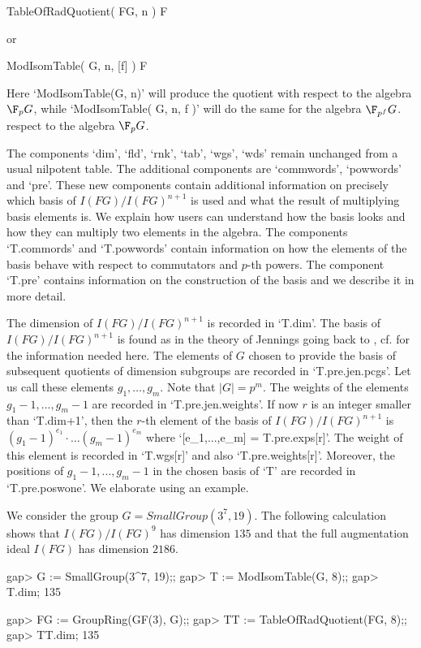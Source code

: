 \> TableOfRadQuotient( FG, n ) F

or 

\> ModIsomTable( G, n, [f] ) F

Here `ModIsomTable(G, n)' will produce the quotient with respect to the algebra
$\F_pG$, while `ModIsomTable( G, n, f )' will do the same for the algebra $\F_{p^f}G$.
respect to the algebra $\F_pG$.
\medskip 

The components `dim', `fld', `rnk', `tab', `wgs', `wds'
 remain unchanged from a usual nilpotent table. The additional components are
`commwords', `powwords' and `pre'. These new components
contain additional information on precisely which basis of $I(FG)/I(FG)^{n+1}$ is used
and what the result of multiplying basis elements is. We explain how users
can understand how the basis looks and how they can multiply two elements in the algebra. 
The components `T.commords' and `T.powwords' contain information on how the elements of
the basis behave with respect to commutators and $p$-th powers. The component `T.pre'
contains information on the construction of the basis and we describe it in more detail.
\medskip

The dimension of $I(FG)/I(FG)^{n+1}$ is recorded in `T.dim'.
The basis of $I(FG)/I(FG)^{n+1}$ is found as in the theory of Jennings going back
to \cite{Jen41}, cf. \cite{MM22} for the information needed here. The elements 
of $G$ chosen to provide the basis of subsequent quotients of dimension subgroups
are recorded in `T.pre.jen.pcgs'. Let us call these elements $g_1,\ldots,g_m$.
Note that $|G| = p^m$.  The weights of the elements $g_1-1,...,g_m-1$ are recorded
in `T.pre.jen.weights'. If now $r$ is an integer smaller than `T.dim+1', then the
$r$-th element of the basis of  $I(FG)/I(FG)^{n+1}$ is 
$(g_1-1)^{e_1} \cdot \ldots (g_m-1)^{e_m}$ where `[e_1,...,e_m] = T.pre.exps[r]'.
The weight of this element is recorded in `T.wgs[r]' and also `T.pre.weights[r]'.
Moreover, the positions of $g_1-1,...,g_m-1$ in the chosen basis of `T' are recorded
in `T.pre.poswone'. We elaborate using an example.
\medskip

We consider the group $G=SmallGroup(3^7, 19)$. The following calculation shows
that $I(FG)/I(FG)^9$ has dimension $135$ and that the full augmentation
ideal $I(FG)$ has dimension $2186$.

\beginexample
gap> G := SmallGroup(3^7, 19);;
gap> T := ModIsomTable(G, 8);;
gap> T.dim;
135

gap> FG := GroupRing(GF(3), G);;
gap> TT := TableOfRadQuotient(FG, 8);;
gap> TT.dim;
135

